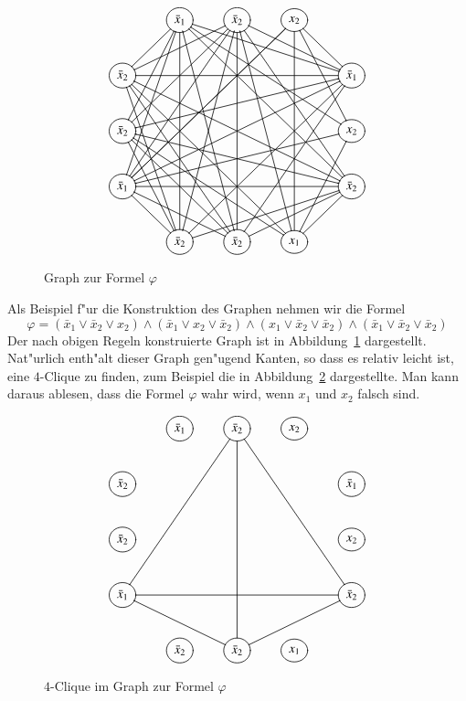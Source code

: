 \begin{beispiel}
\begin{figure}
\[
\entrymodifiers={++[o][F]}
\xymatrix{
*+\txt{}
	&{\bar x_1}
		\ar@{-}[dl] \ar@{-}[ddl] \ar@{-}[dddl]
		\ar@{-}[dddd] \ar@{-}[ddddr] 
		\ar@{-}[drrr] \ar@{-}[ddrrr] \ar@{-}[dddrrr]
		&{\bar x_2}
			\ar@{-}[dddll]
			\ar@{-}[ddddl] \ar@{-}[dddd] \ar@{-}[ddddr]
			\ar@{-}[drr] \ar@{-}[dddrr]
			\ar@{-}[dll] \ar@{-}[ddll]
			&{x_2}
				\ar@{-}[dddlll] \ar@{-}[dddlll]
				\ar@{-}[dddd]
				\ar@{-}[dr] \ar@{-}[ddr]
\\
{\bar x_2}
	\ar@{-}[rrrr] \ar@{-}[rrrrdd]
	\ar@{-}[dddr] \ar@{-}[dddrr] \ar@{-}[dddrrr]
	&*+\txt{}
		&*+\txt{}
			&*+\txt{}
				&{\bar x_1}
					\ar@{-}[dllll] \ar@{-}[ddllll]
					\ar@{-}[dddlll] \ar@{-}[dddll]
\\
{\bar x_2}
	\ar@{-}[rrrrd]
	\ar@{-}[ddr] \ar@{-}[ddrr] \ar@{-}[ddrrr]
	&*+\txt{}
		&*+\txt{}
			&*+\txt{}
				&{x_2}
					\ar@{-}[dllll]
					\ar@{-}[ddl]
\\
{\bar x_1}
	\ar@{-}[rrrr]
	\ar@{-}[dr] \ar@{-}[drr]
	&*+\txt{}
		&*+\txt{}
			&*+\txt{}
				&{\bar x_2}
					\ar@{-}[dlll] \ar@{-}[dll] \ar@{-}[dl]
\\
*+\txt{}
	&{\bar x_2}
		&{\bar x_2}
			&{x_1}
}
\]
\caption{Graph zur Formel $\varphi$\label{phiformel}}
\end{figure}%
Als Beispiel f"ur die Konstruktion des Graphen nehmen wir die Formel
\[
\varphi
=
(\bar x_1\vee \bar x_2\vee x_2)
\wedge
(\bar x_1\vee x_2\vee \bar x_2)
\wedge
(x_1\vee \bar x_2\vee \bar x_2)
\wedge
(\bar x_1\vee \bar x_2\vee \bar x_2)
\]
Der nach obigen Regeln konstruierte Graph ist in Abbildung~\ref{phiformel}
dargestellt.
Nat"urlich enth"alt dieser Graph gen"ugend Kanten, so dass es relativ
leicht ist, eine $4$-Clique zu finden, zum Beispiel die in Abbildung~\ref{phiclique} dargestellte. Man kann daraus ablesen, dass die Formel $\varphi$
wahr wird, wenn $x_1$ und $x_2$ falsch sind.
\begin{figure}
\[
\entrymodifiers={++[o][F]}
\xymatrix{
*+\txt{}
	&{\bar x_1}
		&{\bar x_2}
			\ar@{-}[dddll]
			\ar@{-}[dddd]
			\ar@{-}[dddrr]
			&{x_2}
\\
{\bar x_2}
	&*+\txt{}
		&*+\txt{}
			&*+\txt{}
				&{\bar x_1}
\\
{\bar x_2}
	&*+\txt{}
		&*+\txt{}
			&*+\txt{}
				&{x_2}
\\
{\bar x_1}
	\ar@{-}[rrrr]
	\ar@{-}[drr]
	&*+\txt{}
		&*+\txt{}
			&*+\txt{}
				&{\bar x_2}
					\ar@{-}[dll]
\\
*+\txt{}
	&{\bar x_2}
		&{\bar x_2}
			&{x_1}
}
\]
\caption{$4$-Clique im Graph zur Formel $\varphi$\label{phiclique}}
\end{figure}%
\end{beispiel}

